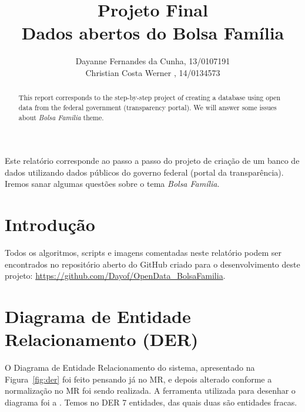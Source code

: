 \documentclass[12pt]{article}
\title{Projeto Final\\ 
	Dados abertos do Bolsa Família}
\author{Dayanne Fernandes da Cunha, 13/0107191\\
	 Christian Costa Werner ,  14/0134573
}
\begin{document}
 
	\maketitle
	
	\begin{abstract}
		This report corresponds to the step-by-step project of creating a database using open data from the federal government (transparency portal). We will answer some issues about \textit{Bolsa Familia} theme.
	\end{abstract}
	
	\begin{resumo} 
		Este relatório corresponde ao passo a passo do projeto de criação de um banco de dados utilizando dados públicos do governo federal (portal da transparência). Iremos sanar algumas questões sobre o tema \textit{Bolsa Família}.
	\end{resumo}
	
	\tableofcontents
	\newpage 
	
	\section{Introdução}
	\label{sec:intro}
	
	Todos os algoritmos, scripts e imagens comentadas neste relatório podem ser encontrados no repositório aberto do GitHub criado para o desenvolvimento deste projeto: \url{https://github.com/Dayof/OpenData_BolsaFamilia}. 
	
	\section{Diagrama de Entidade Relacionamento (DER)}
	\label{sec:der}
	
	O Diagrama de Entidade Relacionamento do sistema, apresentado na Figura~\ref{fig:der} foi feito pensando já no MR, e depois alterado conforme a normalização no MR foi sendo realizada. A ferramenta utilizada para desenhar o diagrama foi a \cite{lucid}. Temos no DER 7 entidades, das quais duas são entidades fracas. 
	
\end{document}
